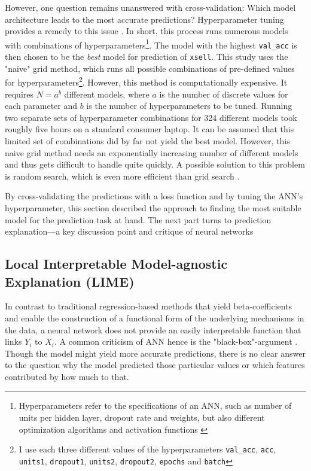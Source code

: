 \documentclass[12pt,a4paper]{article}
\let\code=\texttt
\begin{document}
However, one question remains unanswered with cross-validation: Which model architecture leads to the most accurate predictions?
Hyperparameter tuning provides a remedy to this issue \citep{bergstraRandomSearchHyperparameter2012}.
In short, this process runs numerous models with combinations of hyperparameters\footnote{Hyperparameters refer to the specifications of an ANN,
such as number of units per hidden layer, dropout rate and weights, but also different optimization algorithms and activation functions \citep{bengioGradientbasedOptimizationHyperparameters2000}}. 
The model with the highest \code{val\_acc} is then chosen to be the \textit{best} model for prediction of \code{xsell}.
This study uses the "naive" grid method, which runs all possible combinations of pre-defined values for hyperparameters\footnote{I use each three different values of the hyperparameters \code{val\_acc}, \code{acc}, \code{units1}, \code{dropout1}, \code{units2}, \code{dropout2}, \code{epochs} and \code{batch}}.
However, this method is computationally expensive.
It requires $N=a^b$ different models, where $a$ is the number of discrete values for each parameter and $b$ is the 
number of hyperparameters to be tuned.
Running two separate sets of hyperparameter combinations for 324 different models took roughly five hours on a standard consumer laptop.
It can be assumed that this limited set of combinations did by far not yield the best model.
However, this naive grid method needs an exponentially increasing number of different models and thus gets difficult to handle quite quickly.
A possible solution to this problem is random search, which is even more efficient than grid search \citep{bergstraRandomSearchHyperparameter2012}.

By cross-validating the predictions with a loss function and by tuning the ANN's hyperparameter, 
this section described the approach to finding the most suitable model for the prediction task at hand.
The next part turns to prediction explanation---a key discussion point and critique of neural networks

\subsection{Local Interpretable Model-agnostic Explanation (LIME)}
In contrast to traditional regression-based methods that yield beta-coefficients and enable the construction of a functional form of 
the underlying mechanisms in the data, a neural network does not provide an easily interpretable function that links $Y_i$ to $X_i$.
A common criticism of ANN hence is the "black-box"-argument \citep{benitezAreArtificialNeural1997, dayhoffArtificialNeuralNetworks2001}.
Though the model might yield more accurate predictions, there is no clear answer to the question why the model predicted those particular values
or which features contributed by how much to that.
\end{document}
